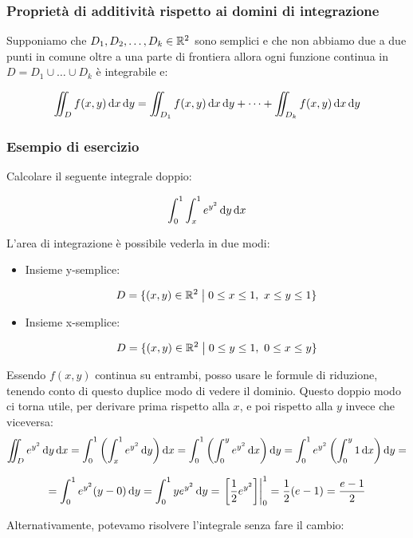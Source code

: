 \subsubsection{Proprietà di additività rispetto ai domini di integrazione}

Supponiamo che \(D_1,D_2,\ldots,D_k \in \mathbb{R}^2\) sono semplici e che non abbiamo due a due punti in comune oltre a una parte di frontiera allora ogni funzione continua in \(D = D_1 \cup \ldots \cup D_k\) è integrabile e:

\[
    \iint_D f(x,y) \mathop{}\!\mathrm{d}{x}\mathop{}\!\mathrm{d}{y} = \iint_{D_1} f(x,y) \mathop{}\!\mathrm{d}{x}\mathop{}\!\mathrm{d}{y} + \cdots + \iint_{D_k} f(x,y) \mathop{}\!\mathrm{d}{x}\mathop{}\!\mathrm{d}{y}
\]

\pagebreak
\subsubsection{Esempio di esercizio}

Calcolare il seguente integrale doppio:

\[
    \int_{0}^{1} {\int_{x}^{1} {e ^{y^{2}}} \mathop{}\!\mathrm{d}{y}\mathop{}\!\mathrm{d}{x}}
\]

L'area di integrazione è possibile vederla in due modi:
\begin{itemize}
    \item Insieme y-semplice:

          \[
              D = \{(x,y) \in \mathbb{R}^2 \;\big|\; 0 \le x \le 1,\ x \le y \le 1\}
          \]
    \item Insieme x-semplice:

          \[
              D = \{(x,y) \in \mathbb{R}^2 \;\big|\; 0 \le y \le 1,\ 0 \le x \le y\}
          \]
\end{itemize}

Essendo \(f(x,y)\) continua su entrambi, posso usare le formule di riduzione, tenendo conto di questo duplice modo di vedere il dominio. Questo doppio modo ci torna utile, per derivare prima rispetto alla \(x\), e poi rispetto alla \(y\) invece che viceversa:
\[
    \iint_D e ^{y^{2}} \diff{y}\diff{x} = \int_{0}^{1} \left(\int_{x}^{1} e ^{y^{2}} \diff{y} \right) \diff{x} = \int_{0}^{1} \left(\int_{0}^{y} e ^{y^{2}} \diff{x} \right) \diff{y} = \int_{0}^{1} e ^{y^{2}}\left(\int_{0}^{y} 1\diff{x} \right) \diff{y}  =
\]

\[
    = \int_{0}^{1} e ^{y^{2}} (y-0) \mathop{}\!\mathrm{d}{y} = \int_{0}^{1} y e ^{y^{2}} \mathop{}\!\mathrm{d}{y} = \left.\left[ \frac{1}{2} e ^{y^{2}} \right]\right\rvert_{0}^{1} = \frac{1}{2} (e -1) = \frac{e-1}{2}
\]

Alternativamente, potevamo risolvere l'integrale senza fare il cambio:

